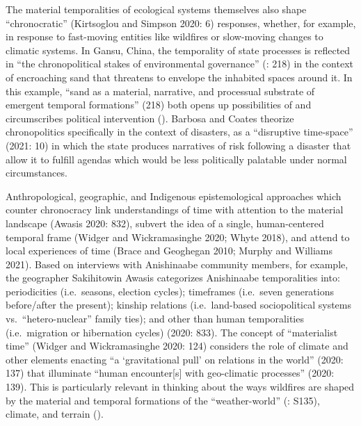 \documentclass[
]{article}
\begin{document}
The material temporalities of ecological systems themselves also shape ``chronocratic'' (Kirtsoglou and Simpson 2020: 6) responses, whether, for example, in response to fast-moving entities like wildfires or slow-moving changes to climatic systems. In Gansu, China, the temporality of state processes is reflected in ``the chronopolitical stakes of environmental governance'' (: 218) in the context of encroaching sand that threatens to envelope the inhabited spaces around it. In this example, ``sand as a material, narrative, and processual substrate of emergent temporal formations'' (218) both opens up possibilities of and circumscribes political intervention (). Barbosa and Coates theorize chronopolitics specifically in the context of disasters, as a ``disruptive time-space'' (2021: 10) in which the state produces narratives of risk following a disaster that allow it to fulfill agendas which would be less politically palatable under normal circumstances.

Anthropological, geographic, and Indigenous epistemological approaches which counter chronocracy link understandings of time with attention to the material landscape (Awasis 2020: 832), subvert the idea of a single, human-centered temporal frame (Widger and Wickramasinghe 2020; Whyte 2018), and attend to local experiences of time (Brace and Geoghegan 2010; Murphy and Williams 2021). Based on interviews with Anishinaabe community members, for example, the geographer Sakihitowin Awasis categorizes Anishinaabe temporalities into: periodicities (i.e.~seasons, election cycles); timeframes (i.e.~seven generations before/after the present); kinship relations (i.e.~land-based sociopolitical systems vs.~``hetero-nuclear'' family ties); and other than human temporalities (i.e.~migration or hibernation cycles) (2020: 833). The concept of ``materialist time'' (Widger and Wickramasinghe 2020: 124) considers the role of climate and other elements enacting ``a `gravitational pull' on relations in the world'' (2020: 137) that illuminate ``human encounter{[}s{]} with geo-climatic processes'' (2020: 139). This is particularly relevant in thinking about the ways wildfires are shaped by the material and temporal formations of the ``weather-world'' (: S135), climate, and terrain ().
\end{document}
